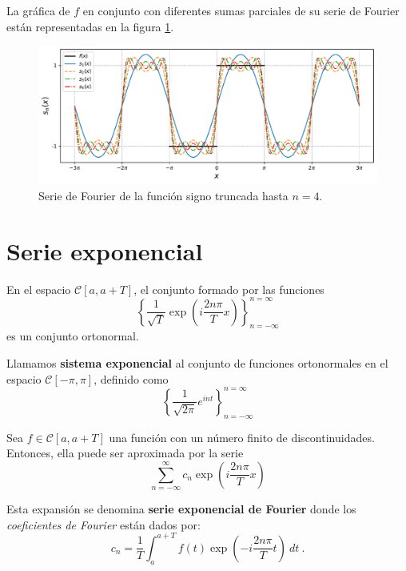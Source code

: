 \begin{ejemplo}
La gráfica de $f$ en conjunto con diferentes sumas parciales de su serie de Fourier están representadas en la figura \ref{fig:EjemploFourier2}.

\begin{figure}[H]
    \centering
    \includegraphics[scale = 0.65]{Figuras/EjemploFourier2.pdf}
    \caption{Serie de Fourier de la función signo truncada hasta $n = 4$.}
     \label{fig:EjemploFourier2}
\end{figure}

\end{ejemplo}

\section{Serie exponencial}

\begin{propo}
    En el espacio $\mathscr{C}[a,a+T]$, el conjunto formado por las funciones 
    \begin{equation}
        \left\{ \frac{1}{\sqrt{T}} \exp\left(i\frac{2n\pi}{T}x\right) \right\}_{n= - \infty}^{n = \infty}
    \end{equation}
    es un conjunto ortonormal.
\end{propo}

\begin{defi} 
    Llamamos \textbf{sistema exponencial} al conjunto de funciones ortonormales en el espacio $\mathscr{C}[-\pi,\pi]$, definido como 
    $$\left\{ \frac{1}{\sqrt{2\pi}} e^{int} \right\}_{n= - \infty}^{n = \infty}$$
\end{defi}

\begin{defi} 
Sea $f \in \mathscr{C}[a,a+T]$ una función con un número finito de discontinuidades. Entonces, ella puede ser aproximada por la serie 
\begin{equation}
     \sum_{n=- \infty}^{\infty} c_n \exp\left(i\frac{2n\pi}{T}x\right) \label{FourierExpo}
\end{equation}

Esta expansión se denomina \textbf{serie exponencial de Fourier}  donde los \textit{coeficientes de Fourier} están dados por:
\begin{equation*}
    c_n = \frac{1}{T} \int_{a}^{a+T} f(t) \exp\left(-i\frac{2n\pi}{T}t \right) \ dt \ .
\end{equation*}
\end{defi}

